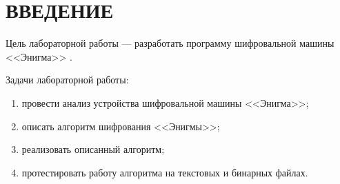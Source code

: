 \chapter*{ВВЕДЕНИЕ}

Цель лабораторной работы --- разработать программу шифровальной машины <<Энигма>> \cite{Enigma}.

Задачи лабораторной работы:

\begin{enumerate}[label=---]
    \item провести анализ устройства шифровальной машины <<Энигма>>;
    \item описать алгоритм шифрования <<Энигмы>>;
    \item реализовать описанный алгоритм;
    \item протестировать работу алгоритма на текстовых и бинарных файлах.
\end{enumerate}
